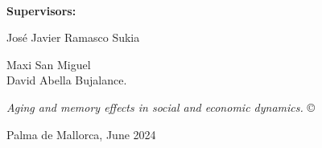 \documentclass[
	10pt, %
	a4paper,
]{LegrandOrangeBook}
\begin{document}








\thispagestyle{empty} %

~\vfill %
\sffamily

\noindent \textbf{Supervisors:}

\noindent Jos\'e Javier Ramasco Sukia

\noindent Maxi San Miguel \\

\noindent David Abella Bujalance.

\noindent \textit{Aging and memory effects in social and economic dynamics.} \copyright

\noindent Palma de Mallorca, June 2024
\pagebreak


\newpage
\thispagestyle{plain} %
\mbox{}


\newpage
\thispagestyle{plain} %
\mbox{}

\newpage
\thispagestyle{plain} %
\mbox{}

\end{document}
